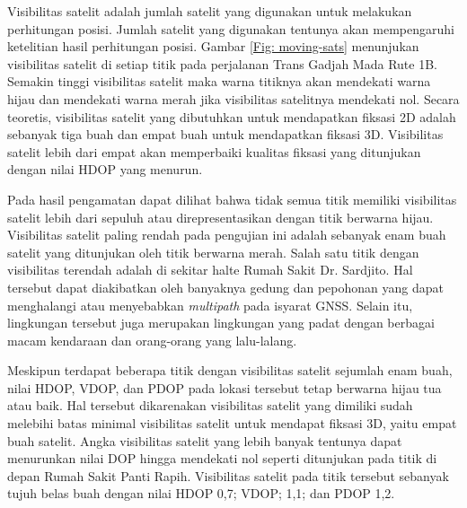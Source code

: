 Visibilitas satelit adalah jumlah satelit yang digunakan untuk melakukan perhitungan posisi. Jumlah satelit yang digunakan tentunya akan mempengaruhi ketelitian hasil perhitungan posisi. Gambar \ref{Fig: moving-sats} menunjukan visibilitas satelit di setiap titik pada perjalanan Trans Gadjah Mada Rute 1B. Semakin tinggi visibilitas satelit maka warna titiknya akan mendekati warna hijau dan mendekati warna merah jika visibilitas satelitnya mendekati nol. Secara teoretis, visibilitas satelit yang dibutuhkan untuk mendapatkan fiksasi 2D adalah sebanyak tiga buah dan empat buah untuk mendapatkan fiksasi 3D. Visibilitas satelit lebih dari empat akan memperbaiki kualitas fiksasi yang ditunjukan dengan nilai HDOP yang menurun. 

Pada hasil pengamatan dapat dilihat bahwa tidak semua titik memiliki visibilitas satelit lebih dari sepuluh atau direpresentasikan dengan titik berwarna hijau. Visibilitas satelit paling rendah pada pengujian ini adalah sebanyak enam buah satelit yang ditunjukan oleh titik berwarna merah. Salah satu titik dengan visibilitas terendah adalah di sekitar halte Rumah Sakit Dr. Sardjito. Hal tersebut dapat diakibatkan oleh banyaknya gedung dan pepohonan yang dapat menghalangi atau menyebabkan \textit{multipath} pada isyarat GNSS. Selain itu, lingkungan tersebut juga merupakan lingkungan yang padat dengan berbagai macam kendaraan dan orang-orang yang lalu-lalang.

Meskipun terdapat beberapa titik dengan visibilitas satelit sejumlah enam buah, nilai HDOP, VDOP, dan PDOP pada lokasi tersebut tetap berwarna hijau tua atau baik. Hal tersebut dikarenakan visibilitas satelit yang dimiliki sudah melebihi batas minimal visibilitas satelit untuk mendapat fiksasi 3D, yaitu empat buah satelit. Angka visibilitas satelit yang lebih banyak tentunya dapat menurunkan nilai DOP hingga mendekati nol seperti ditunjukan pada titik di depan Rumah Sakit Panti Rapih. Visibilitas satelit pada titik tersebut sebanyak tujuh belas buah dengan nilai HDOP 0,7; VDOP; 1,1; dan PDOP 1,2.
